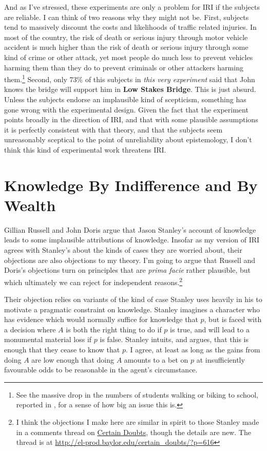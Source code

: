 \documentclass[11pt,oneside]{book}
\begin{document}
And as I've stressed, these experiments are only a problem for IRI if the subjects are reliable. I can think of two reasons why they might not be. First, subjects tend to massively discount the costs and likelihoods of traffic related injuries. In most of the country, the risk of death or serious injury through motor vehicle accident is much higher than the risk of death or serious injury through some kind of crime or other attack, yet most people do much less to prevent vehicles harming them than they do to prevent criminals or other attackers harming them.\footnote{See the massive drop in the numbers of students walking or biking to school, reported in \cite{Ham2008}, for a sense of how big an issue this is.} Second, only 73\% of this subjects in \textit{this very experiment} said that John knows the bridge will support him in \textbf{Low Stakes Bridge}. This is just absurd. Unless the subjects endorse an implausible kind of scepticism, something has gone wrong with the experimental design. Given the fact that the experiment points broadly in the direction of IRI, and that with some plausible assumptions it is perfectly consistent with that theory, and that the  subjects seem unreasonably sceptical to the point of unreliability about epistemology, I don't think this kind of experimental work threatens IRI.

\section{Knowledge By Indifference and By Wealth}

Gillian Russell and John Doris \citeyearpar{RussellDoris2008} argue that Jason Stanley's account of knowledge leads to some implausible attributions of knowledge. Insofar as my version of IRI agrees with Stanley's about the kinds of cases they are worried about, their objections are also objections to my theory. I'm going to argue that Russell and Doris's objections turn on principles that are \textit{prima facie} rather plausible, but which ultimately we can reject for independent reasons.\footnote{I think the objections I make here are similar in spirit to those Stanley made in a comments thread on \href{http://el-prod.baylor.edu/certain_doubts/?p=616}{Certain Doubts}, though the details are new. The thread is at \href{http://el-prod.baylor.edu/certain_doubts/?p=616}{http://el-prod.baylor.edu/certain\_doubts/?p=616}}

Their objection relies on variants of the kind of case Stanley uses heavily in his \citeyearpar{Stanley2005-STAKAP} to motivate a pragmatic constraint on knowledge. Stanley imagines a character who has evidence which would normally suffice for knowledge that \(p\), but is faced with a decision where \(A\) is both the right thing to do if \(p\) is true, and will lead to a monumental material loss if \(p\) is false. Stanley intuits, and argues, that this is enough that they cease to know that \(p\). I agree, at least as long as the gains from doing \(A\) are low enough that doing \(A\) amounts to a bet on \(p\) at insufficiently favourable odds to be reasonable in the agent's circumstance.
\end{document}
